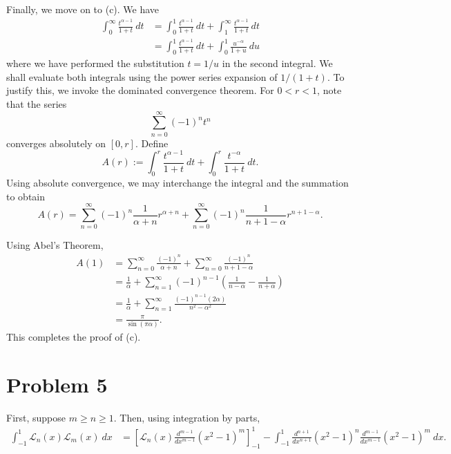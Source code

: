 \documentclass[12pt]{amsart}
\newcommand{\calL}{\mathcal{L}}
\begin{document}
Finally, we move on to (c). We have 
\begin{align*}
	\int_{0}^\infty\frac{t^{\alpha - 1}}{1 + t}~dt &= \int_0^1\frac{t^{\alpha - 1}}{1 + t}~dt + \int_{1}^\infty\frac{t^{\alpha - 1}}{1 + t}~dt\\
	&= \int_0^1\frac{t^{\alpha - 1}}{1 + t}~dt + \int_0^1\frac{u^{-\alpha}}{1 + u}~du
\end{align*}
where we have performed the substitution $t = 1/u$ in the second integral. We shall evaluate both integrals using the power series expansion of $1/(1 + t)$. To justify this, we invoke the dominated convergence theorem. For $0 < r < 1$, note that the series 
\begin{equation}
	\sum_{n = 0}^\infty (-1)^n t^n
\end{equation}
converges absolutely on $[0,r]$. Define 
\begin{equation*}
	A(r) := \int_0^r\frac{t^{\alpha - 1}}{1 + t}~dt + \int_0^r\frac{t^{-\alpha}}{1 + t}~dt.
\end{equation*}
Using absolute convergence, we may interchange the integral and the summation to obtain 
\begin{equation*}
	A(r) = \sum_{n = 0}^\infty (-1)^n\frac{1}{\alpha + n}r^{\alpha + n} + \sum_{n = 0}^\infty (-1)^n\frac{1}{n + 1 - \alpha}r^{n + 1 - \alpha}.
\end{equation*}

Using Abel's Theorem, 
\begin{align*}
	A(1) &= \sum_{n = 0}^\infty\frac{(-1)^n}{\alpha + n} + \sum_{n = 0}^\infty\frac{(-1)^n}{n + 1 - \alpha}\\
	&= \frac{1}{\alpha} + \sum_{n = 1}^\infty(-1)^{n - 1}\left(\frac{1}{n - \alpha} - \frac{1}{n + \alpha}\right)\\
	&= \frac{1}{\alpha} + \sum_{n = 1}^\infty\frac{(-1)^{n - 1}(2\alpha)}{n^2 - \alpha^2}\\
	&= \frac{\pi}{\sin(\pi\alpha)}.
\end{align*}
This completes the proof of (c).

\section*{Problem 5}

First, suppose $m\ge n\ge 1$. Then, using integration by parts,
\begin{align*}
	\int_{-1}^1 \calL_n(x)\calL_m(x)~dx &= \left[\calL_n(x)\frac{d^{m - 1}}{dx^{m - 1}}(x^2 - 1)^m\right]_{-1}^1 - \int_{-1}^1\frac{d^{n + 1}}{dx^{n + 1}}(x^2 - 1)^n\frac{d^{m - 1}}{dx^{m - 1}}(x^2 - 1)^m~dx.
\end{align*}
\end{document}
